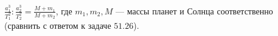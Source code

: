 $\frac{a_1^3}{T_1^2}:\frac{a_2^3}{T_2^2}=\frac{M+m_1}{M+m_2}$, где
$m_1, m_2, M$ --- массы планет и Солнца соответственно (сравнить с
ответом к задаче $51.26$).
